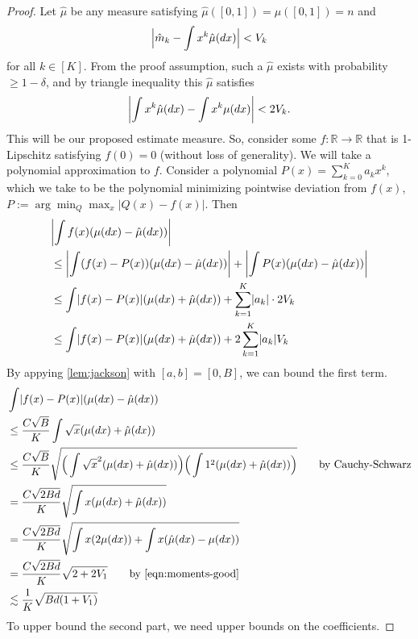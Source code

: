 \documentclass{article}
\theoremstyle{definition}
\DeclarePairedDelimiter{\abs}{\lvert}{\rvert}
\begin{document}
\begin{proof}
Let $\hat{\mu}$ be any measure satisfying $\hat{\mu}([0,1]) = \mu([0,1]) = n$ and
\begin{align*}
    \abs[\Big]{\hat{m}_k - \int  x^k \hat{\mu}(dx)} < V_k
\end{align*}
for all $k \in [K]$.
From the proof assumption, such a $\hat{\mu}$ exists with probability $\geq 1-\delta$, and by triangle inequality this $\hat{\mu}$ satisfies
\begin{equation} \label{eqn:moments-good}
    \abs*{\int x^k\hat{\mu}(dx) - \int x^k \mu(dx)} < 2V_k.
\end{equation}
This will be our proposed estimate measure.
So, consider some $f: \mathbb{R} \to \mathbb{R}$ that is 1-Lipschitz satisfying $f(0) = 0$ (without loss of generality).
We will take a polynomial approximation to $f$.
Consider a polynomial $P(x) = \sum_{k=0}^K a_kx^k$, which we take to be the polynomial minimizing pointwise deviation from $f(x)$, $P := \arg\min_Q \max_x |Q(x) - f(x)|$.
Then
\begin{align*}
    &\abs*{\int f(x)(\mu(dx) - \hat{\mu}(dx))} \\
    & \leq \abs*{\int (f(x) - P(x))(\mu(dx) - \hat{\mu}(dx))} + \abs*{\int P(x)(\mu(dx) - \hat{\mu}(dx))} \\
    & \leq \int \abs{f(x) - P(x)}(\mu(dx) + \hat{\mu}(dx)) + \sum_{k=1}^K \abs{a_k}\cdot 2 V_k \\
    & \leq \int \abs{f(x) - P(x)}(\mu(dx) + \hat{\mu}(dx)) + 2\sum_{k=1}^K \abs{a_k}V_k
\end{align*}
By appying \cref{lem:jackson} with $[a, b] = [0, B]$, we can bound the first term.
\begin{align*}
    &\int \abs{f(x) - P(x)}(\mu(dx) - \hat{\mu}(dx)) \\
    &\leq \frac{C\sqrt{B}}{K}\int \sqrt{x}(\mu(dx) + \hat{\mu}(dx)) \\
    &\leq \frac{C\sqrt{B}}{K} \sqrt{\Big(\int \sqrt{x}^2 (\mu(dx) + \hat{\mu}(dx))\Big)\Big(\int 1^2 (\mu(dx) + \hat{\mu}(dx))\Big)} \tag*{by Cauchy-Schwarz} \\
    &= \frac{C\sqrt{2Bd}}{K} \sqrt{\int x (\mu(dx) + \hat{\mu}(dx))} \\
    &= \frac{C\sqrt{2Bd}}{K} \sqrt{\int x (2\mu(dx)) + \int x(\hat{\mu}(dx) - \mu(dx))} \\
    &= \frac{C\sqrt{2Bd}}{K} \sqrt{2+2V_1} \tag*{by \cref{eqn:moments-good}} \\
    &\lesssim \frac1K\sqrt{Bd(1+V_1)}
\end{align*}
To upper bound the second part, we need upper bounds on the coefficients.

\end{proof}
\end{document}
